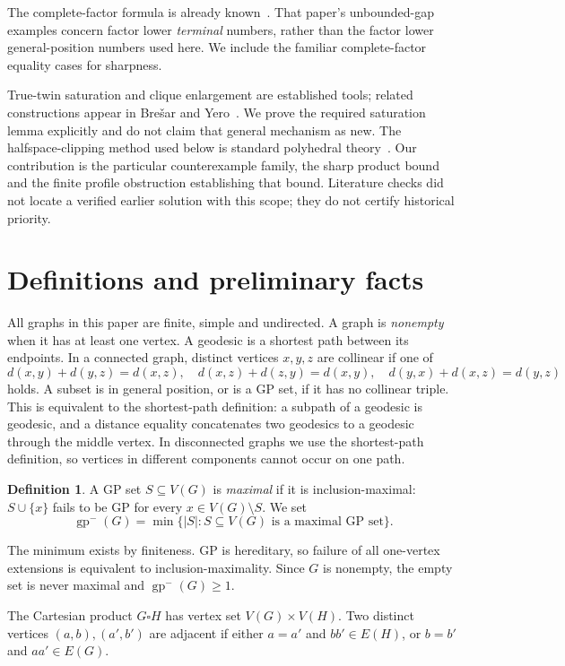 \documentclass[11pt]{article}
\theoremstyle{definition}
\newtheorem{definition}[theorem]{Definition}
\theoremstyle{remark}
\newcommand{\lgp}{\operatorname{gp}^{-}}
\newcommand{\card}[1]{\lvert #1\rvert}
\begin{document}
The complete-factor formula is already known~\cite{WKT}. That paper's
unbounded-gap examples concern factor lower \emph{terminal} numbers,
rather than the factor lower general-position numbers used here.
We include the familiar complete-factor equality cases for sharpness.

True-twin saturation and clique enlargement are established tools; related
constructions appear in Bre\v{s}ar and Yero~\cite[Section~2.2,
Proposition~5]{BY}. We prove the required saturation lemma explicitly and
do not claim that general mechanism as new. The halfspace-clipping method
used below is standard polyhedral theory~\cite{Avis}. Our contribution is
the particular counterexample family, the sharp product bound and the
finite profile obstruction establishing that bound. Literature checks did
not locate a verified earlier solution with this scope; they do not certify
historical priority.

\section{Definitions and preliminary facts}\label{sec:definitions}

All graphs in this paper are finite, simple and undirected. A graph is
\emph{nonempty} when it has at least one vertex. A geodesic is a shortest path
between its endpoints. In a connected graph, distinct vertices $x,y,z$ are
collinear if one of
\[
 d(x,y)+d(y,z)=d(x,z),\quad
 d(x,z)+d(z,y)=d(x,y),\quad
 d(y,x)+d(x,z)=d(y,z)
\]
holds. A subset is in general position, or is a GP set, if it has no collinear
triple. This is equivalent to the shortest-path definition: a subpath of a
geodesic is geodesic, and a distance equality concatenates two geodesics to a
geodesic through the middle vertex. In disconnected graphs we use the
shortest-path definition, so vertices in different components cannot occur
on one path.

\begin{definition}
A GP set $S\subseteq V(G)$ is \emph{maximal} if it is inclusion-maximal:
$S\cup\{x\}$ fails to be GP for every $x\in V(G)\setminus S$. We set
\[
 \lgp(G)=\min\{\card S:S\subseteq V(G)\text{ is a maximal GP set}\}.
\]
\end{definition}
The minimum exists by finiteness. GP is hereditary, so failure of all
one-vertex extensions is equivalent to inclusion-maximality. Since $G$ is
nonempty, the empty set is never maximal and $\lgp(G)\geq1$.

The Cartesian product $G\square H$ has vertex set $V(G)\times V(H)$.
Two distinct vertices $(a,b),(a',b')$ are adjacent if either $a=a'$ and
$bb'\in E(H)$, or $b=b'$ and $aa'\in E(G)$.
\end{document}
